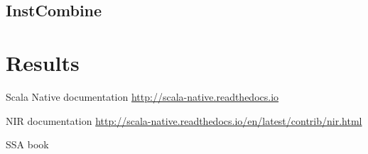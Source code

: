\documentclass[11pt,a4paper]{article}
\begin{document}
\subsection{InstCombine}



\section{Results}


\begin{thebibliography}{9}

    Scala Native documentation \newline \url{http://scala-native.readthedocs.io}

	 NIR documentation \newline \url{http://scala-native.readthedocs.io/en/latest/contrib/nir.html}
	
	 SSA book

\end{thebibliography}
\end{document}
